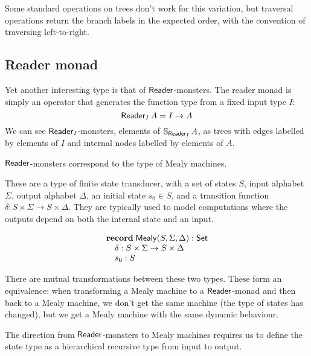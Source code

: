 Some standard operations on trees don't work for this variation, but traversal operations return the branch labels in the expected order, with the convention of traversing left-to-right. 

\subsection{Reader monad}

Yet another interesting type is that of $\mathsf{Reader}$-monsters.
The reader monad is simply an operator that generates the function type from a fixed input type $I$:
$$
\mathsf{Reader}_I\,A = I \rightarrow A
$$
We can see $\mathsf{Reader}_I$-monsters, elements of $\mathbb{S}_{\mathsf{Reader}_I}\,A$, as trees with edges labelled by elements of $I$ and internal nodes labelled by elements of $A$.

$\mathsf{Reader}$-monsters correspond to the type of Mealy machines. 

These are a type of finite state transducer, with a set of states $S$, input alphabet $\Sigma$, output alphabet $\Delta$, an initial state $s_0 \in S$, and a transition function $\delta : S \times \Sigma \to S \times \Delta$. They are typically used to model computations where the outputs depend on both the internal state and an input.

$$
\begin{array}[t]{l}
\mathbf{record}\;
\mathsf{Mealy}(S,\Sigma,\Delta):\mathsf{Set}\\
\quad \delta : S \times \Sigma \to S \times \Delta \\
\quad s_0 : S
\end{array}
$$

There are mutual transformations between these two types.
These form an equivalence: when transforming a Mealy machine to a $\mathsf{Reader}$-monad and then back to a Mealy machine, we don't get the same machine (the type of states has changed), but we get a Mealy machine with the same dynamic behaviour.

The direction from $\mathsf{Reader}$-monsters to Mealy machines requires us to define the state type as a hierarchical recursive type from input to output.




